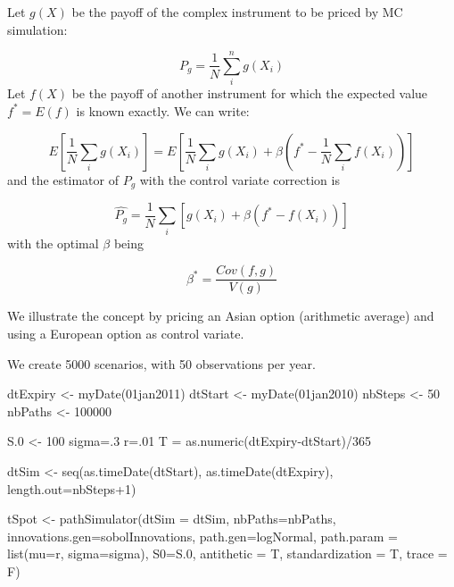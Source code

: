 \documentclass[12pt,]{tufte-book}
\newenvironment{Shaded}{}{}
\newcommand{\AttributeTok}[1]{\textcolor[rgb]{0.49,0.56,0.16}{#1}}
\newcommand{\DecValTok}[1]{\textcolor[rgb]{0.25,0.63,0.44}{#1}}
\newcommand{\FloatTok}[1]{\textcolor[rgb]{0.25,0.63,0.44}{#1}}
\newcommand{\FunctionTok}[1]{\textcolor[rgb]{0.02,0.16,0.49}{#1}}
\newcommand{\NormalTok}[1]{#1}
\newcommand{\OtherTok}[1]{\textcolor[rgb]{0.00,0.44,0.13}{#1}}
\newcommand{\SpecialCharTok}[1]{\textcolor[rgb]{0.25,0.44,0.63}{#1}}
\newcommand{\StringTok}[1]{\textcolor[rgb]{0.25,0.44,0.63}{#1}}
\begin{document}
Let \(g(X)\) be the payoff of the complex instrument to be priced by MC simulation:

\[
P_g = \frac{1}{N} \sum_i^n g(X_i)
\]
Let \(f(X)\) be the payoff of another instrument for which the expected value \(f^* = E(f)\) is known exactly. We can write:

\[
E \left[ \frac{1}{N} \sum_i g(X_i) \right] = E \left[ \frac{1}{N} \sum_i g(X_i) + \beta \left( f^* - \frac{1}{N} \sum_i f(X_i) \right) \right]
\]
and the estimator of \(P_g\) with the control variate correction is

\[
\hat{P_g} = \frac{1}{N} \sum_i \left[ g(X_i) + \beta (f^* - f(X_i)) \right]
\]
with the optimal \(\beta\) being

\[
\beta^* = \frac{Cov(f,g)}{V(g)}
\]

We illustrate the concept by pricing an Asian option (arithmetic average) and using a European option as control variate.

We create 5000 scenarios, with 50 observations per year.

\begin{Shaded}
\begin{Highlighting}[]
\NormalTok{dtExpiry }\OtherTok{\textless{}{-}} \FunctionTok{myDate}\NormalTok{(}\StringTok{\textquotesingle{}01jan2011\textquotesingle{}}\NormalTok{)}
\NormalTok{dtStart }\OtherTok{\textless{}{-}} \FunctionTok{myDate}\NormalTok{(}\StringTok{\textquotesingle{}01jan2010\textquotesingle{}}\NormalTok{)}
\NormalTok{nbSteps }\OtherTok{\textless{}{-}} \DecValTok{50}
\NormalTok{nbPaths }\OtherTok{\textless{}{-}} \DecValTok{100000}

\NormalTok{S}\FloatTok{.0} \OtherTok{\textless{}{-}} \DecValTok{100}
\NormalTok{sigma}\OtherTok{=}\NormalTok{.}\DecValTok{3}
\NormalTok{r}\OtherTok{=}\NormalTok{.}\DecValTok{01}
\NormalTok{T }\OtherTok{=} \FunctionTok{as.numeric}\NormalTok{(dtExpiry}\SpecialCharTok{{-}}\NormalTok{dtStart)}\SpecialCharTok{/}\DecValTok{365}

\NormalTok{dtSim }\OtherTok{\textless{}{-}} \FunctionTok{seq}\NormalTok{(}\FunctionTok{as.timeDate}\NormalTok{(dtStart), }\FunctionTok{as.timeDate}\NormalTok{(dtExpiry),}
             \AttributeTok{length.out=}\NormalTok{nbSteps}\SpecialCharTok{+}\DecValTok{1}\NormalTok{)}

\NormalTok{tSpot }\OtherTok{\textless{}{-}} \FunctionTok{pathSimulator}\NormalTok{(}\AttributeTok{dtSim =}\NormalTok{ dtSim, }\AttributeTok{nbPaths=}\NormalTok{nbPaths, }
    \AttributeTok{innovations.gen=}\NormalTok{sobolInnovations, }\AttributeTok{path.gen=}\NormalTok{logNormal, }
    \AttributeTok{path.param =} \FunctionTok{list}\NormalTok{(}\AttributeTok{mu=}\NormalTok{r, }\AttributeTok{sigma=}\NormalTok{sigma), }\AttributeTok{S0=}\NormalTok{S}\FloatTok{.0}\NormalTok{, }
    \AttributeTok{antithetic =}\NormalTok{ T, }
    \AttributeTok{standardization =}\NormalTok{ T, }\AttributeTok{trace =}\NormalTok{ F)}
\end{Highlighting}
\end{Shaded}
\end{document}
